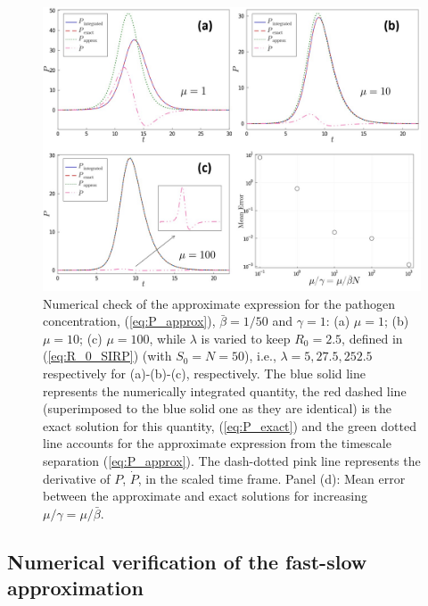 \begin{figure}[H]
    \centering
    \includegraphics[width=1\textwidth]{Figures/P_comparison.jpg}
    \caption{Numerical check of the approximate expression for the pathogen
        concentration, (\cref{eq:P_approx}), $\bar{\beta}=1/50$ and $\gamma=1$:
        (a)
        $\mu=1$; (b) $\mu=10$; (c) $\mu=100$, while $\lambda$ is varied to keep
        $R_0=2.5$, defined in (\cref{eq:R_0_SIRP}) (with $S_0=N=50$), i.e.,
        $\lambda=5,
            27.5, 252.5$ respectively for (a)-(b)-(c), respectively.
        The blue solid line represents the numerically integrated quantity, the
        red dashed line (superimposed to the blue solid one as they are
        identical) is
        the exact solution for this quantity, (\cref{eq:P_exact}) and the green
        dotted
        line accounts for the approximate expression from the timescale
        separation
        (\cref{eq:P_approx}). The dash-dotted pink line represents the
        derivative of
        $P$, $\dot{P}$, in the scaled time frame. Panel (d): Mean error between
        the
        approximate and exact solutions for increasing
        $\mu/\gamma=\mu/\bar{\beta}$.}
    \label{fig:P_comparison}
\end{figure}

\subsection{Numerical verification of the fast-slow approximation}


